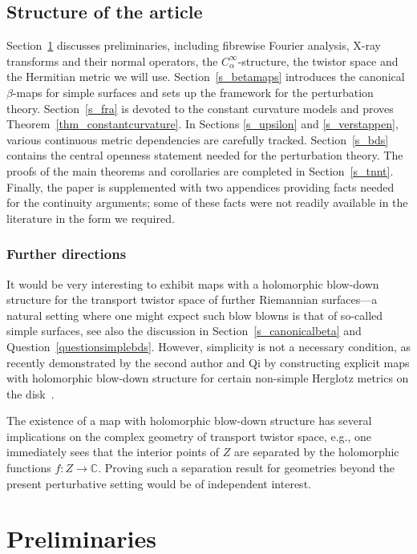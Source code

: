 \documentclass[10pt,a4paper]{amsart}
\numberwithin{equation}{section}
\theoremstyle{definition}
\newcommand{\C}{\mathbb{C}} %
\newcommand{\1}{{\bf 1}}
\begin{document}
\subsection{Structure of the article} Section~\ref{s_prelim} discusses preliminaries, including fibrewise Fourier analysis, X-ray transforms and their normal operators, the $C^{\infty}_{\alpha}$-structure, the twistor space and the Hermitian metric we will use.
Section~\ref{s_betamaps} introduces the canonical $\beta$-maps for simple surfaces and sets up the framework for the perturbation theory.
Section~\ref{s_fra} is devoted to the constant curvature models and proves Theorem~\ref{thm_constantcurvature}.
In Sections \ref{s_upsilon} and \ref{s_verstappen},
 various continuous metric dependencies are carefully tracked. Section~\ref{s_bds} contains the central openness statement needed for the perturbation theory.
The proofs of the main theorems and corollaries are completed in Section~\ref{s_tnnt}. Finally, the paper is supplemented with two appendices providing facts needed for the continuity arguments; some of these facts were not readily available in the literature in the form we required.

\subsubsection{Further directions} It would be very interesting to exhibit maps with a holomorphic blow-down structure for the transport twistor space of further Riemannian surfaces---a natural setting where one might expect such blow blowns is that of so-called simple surfaces, see also the discussion in Section~\ref{s_canonicalbeta} and Question~\ref{questionsimplebds}.
However, simplicity is not a necessary condition, as recently demonstrated by the second author and Qi by constructing explicit maps with holomorphic blow-down structure for certain non-simple Herglotz metrics on the disk~\cite{MoQi25}.

The existence of a map with holomorphic blow-down structure has several implications on the complex geometry of transport twistor space, e.g., one immediately sees that the interior points of $Z$ are separated by the holomorphic functions $f\colon Z\to \C$. Proving such a separation result for geometries beyond the present perturbative setting would be of independent interest.


\section{Preliminaries}\label{s_prelim}
\end{document}
